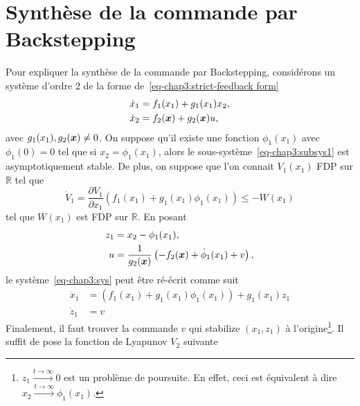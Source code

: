 \section{Synthèse de la commande par Backstepping}
Pour expliquer la synthèse de la commande par Backstepping, considérons un système d'ordre 2 de la forme de~\eqref{eq-chap3:strict-feedback form}
	\begin{subequations}\label{eq-chap3:sys}
		\begin{align}
			\label{eq-chap3:subsys1}	\dot{x}_1 &= f_1(x_1) + g_1(x_1)x_2,\\
			\label{eq-chap3:subsys2}	\dot{x}_2 &= f_2(\bm{x}) + g_2(\bm{x})u,
		\end{align}
	\end{subequations}
avec $g_1(x_1),g_2(\bm{x})\neq0$. On suppose qu'il existe une fonction $\phi_1(x_1)$ avec $\phi_1(0)=0$ tel que si $x_2 = \phi_1(x_1)$, alors le sous-système~\eqref{eq-chap3:subsys1} est asymptotiquement stable. De plus, on suppose que l'on connait $V_1(x_1)$ FDP sur $\mathbb{R}$ tel que 
\begin{equation}
	\dot{V}_1=\frac{\partial V_1}{\partial x_1}\left(f_1(x_1) + g_1(x_1)\phi_1(x_1)\right)\leq - W(x_1)
\end{equation}
tel que $W(x_1)$ est FDP sur $\mathbb{R}$. En posant 
\begin{align}\label{eq-chap3:change of variables z}
	z_1&=x_2-\phi_1(x_1),\\
	\label{eq-chap3:change of variables u}u &= \frac{1}{g_2(\bm{x})}\left(-f_2(\bm{x}) +\dot{\phi}_1(x_1) + v\right),
\end{align}
  le système~\eqref{eq-chap3:sys} peut être ré-écrit comme suit 
	\begin{subequations}\label{eq-chap3:sys_modif}
	\begin{align}
			\dot{x}_1 &= \left(f_1(x_1) + g_1(x_1)\phi_1(x_1)\right) + g_1(x_1)z_1\\
			\dot{z}_1 &= v
	\end{align}
	\end{subequations}
Finalement, il faut trouver la commande $v$ qui stabilize  $(x_1,z_1)$ à l'origine\footnote{$z_1\overset{t\rightarrow\infty}{\longrightarrow}0$ est un problème de poursuite. En effet, ceci est équivalent à dire $ x_2\overset{t\rightarrow\infty}{\longrightarrow}\phi_1(x_1)$.}. Il suffit de pose la fonction de Lyapunov $V_2$ suivante 
